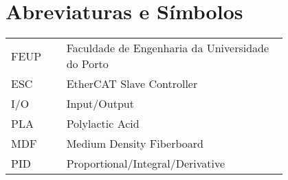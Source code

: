 \chapter*{Abreviaturas e Símbolos}

\begin{flushleft}
\begin{tabular}{l p{0.8\linewidth}}
FEUP     & Faculdade de Engenharia da Universidade do Porto\\
ESC      & EtherCAT Slave Controller\\
I/O      & Input/Output\\
PLA      & Polylactic Acid\\
MDF      & Medium Density Fiberboard\\
PID      & Proportional/Integral/Derivative\\
\end{tabular}
\end{flushleft}

